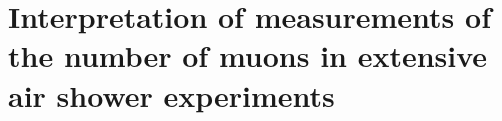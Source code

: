 \chapter[Interpretation of measurements of the number of muons in extensive air shower experiments]{Interpretation of measurements of the number of muons in extensive air shower experiments}
\label{sec:interpretation}




